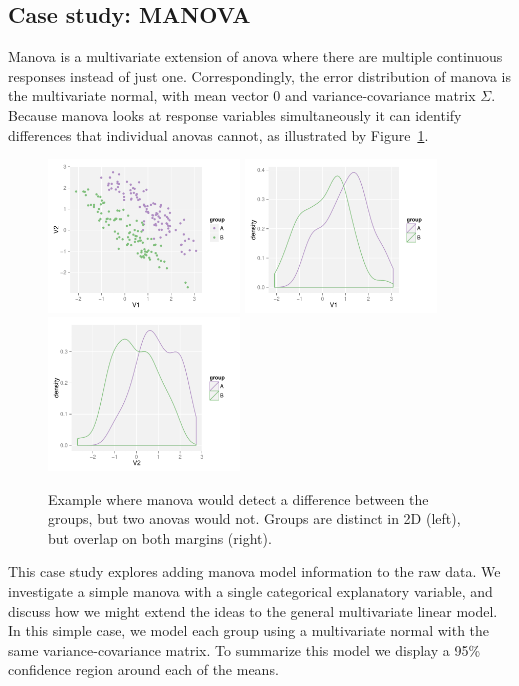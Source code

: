 \documentclass[preprint]{imsart}
\begin{document}
\subsection{Case study: MANOVA}
\label{sub:manova}

{\sc Manova} is a multivariate extension of {\sc anova} where there are multiple continuous responses instead of just one.  Correspondingly, the error distribution of {\sc manova} is the multivariate normal, with mean vector 0 and variance-covariance matrix $\Sigma$. Because {\sc manova} looks at response variables simultaneously it can identify differences that individual {\sc anova}s cannot, as illustrated by Figure~\ref{fig:manova-ex}.

\begin{figure}[htb]
  \centering
    \includegraphics[width=2in]{manova-example}
    \includegraphics[width=2in]{manova-example-m1}
    \includegraphics[width=2in]{manova-example-m2}
  \caption{Example where {\sc manova} would detect a difference between the groups, but two {\sc anova}s would not.  Groups are distinct in 2D (left), but overlap on both margins (right).}
  \label{fig:manova-ex}
\end{figure}

This case study explores adding {\sc manova} model information to the raw data. We  investigate a simple {\sc manova} with a single categorical explanatory variable, and discuss how we might extend the ideas to the general multivariate linear model. In this simple case, we model each group using a multivariate normal with the same variance-covariance matrix. To summarize this model we  display a 95\% confidence region around each of the means.
\end{document}
